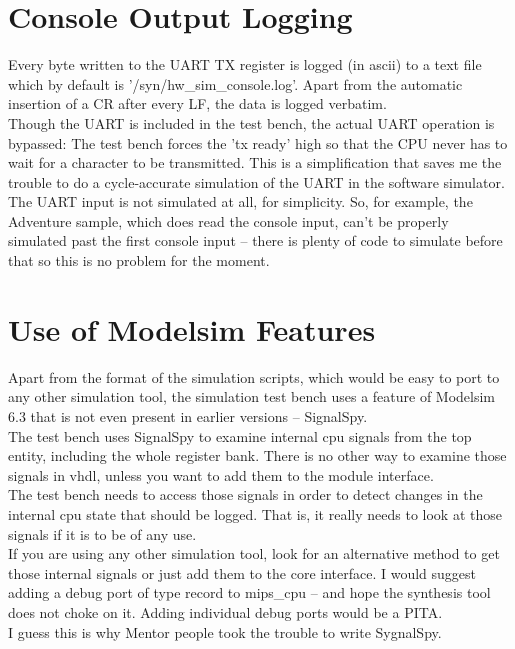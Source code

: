 \section{Console Output Logging}
\label{uart_logging}

    Every byte written to the UART TX register is logged (in ascii) to a text
    file which by default is '/syn/hw\_sim\_console.log'. Apart from the
    automatic insertion of a CR after every LF, the data is logged verbatim.\\
    
    Though the UART is included in the test bench, the actual UART operation is 
    bypassed: The test bench forces the 'tx ready' high so that the CPU never has
    to wait for a character to be transmitted. This is a simplification that 
    saves me the trouble to do a cycle-accurate simulation of the UART in the 
    software simulator.\\
    
    The UART input is not simulated at all, for simplicity. So, for example, the
    Adventure sample, which does read the console input, can't be properly 
    simulated past the first console input -- there is plenty of code to 
    simulate before that so this is no problem for the moment.\\


\section{Use of Modelsim Features}
\label{modelsim_dependencies}

    Apart from the format of the simulation scripts, which would be easy to port
    to any other simulation tool, the simulation test bench uses a feature of
    Modelsim 6.3 that is not even present in earlier versions -- SignalSpy.\\

    The test bench uses SignalSpy to examine internal cpu signals from the top
    entity, including the whole register bank. There is no other way to examine
    those signals in vhdl, unless you want to add them to the module interface.\\

    The test bench needs to access those signals in order to detect changes in
    the internal cpu state that should be logged. That is, it really needs to
    look at those signals if it is to be of any use.\\

    If you are using any other simulation tool, look for an alternative method
    to get those internal signals or just add them to the core interface. I
    would suggest adding a debug port of type record to mips\_cpu -- and hope the
    synthesis tool does not choke on it. Adding individual debug ports would be
    a PITA.\\
    I guess this is why Mentor people took the trouble to write SygnalSpy.\\

